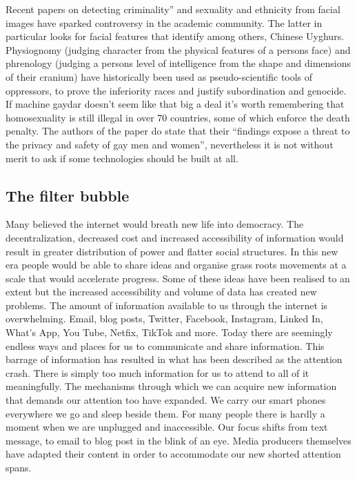 Recent papers on detecting criminality''\cite{CriminalFace} and sexuality\cite{SexualityFace} and ethnicity\cite{EthnicityFace} from facial images have sparked controversy in the academic community. The latter in particular looks for facial features that identify among others, Chinese Uyghurs. Physiognomy (judging character from the physical features of a persons face) and phrenology (judging a persons level of intelligence from the shape and dimensions of their cranium) have historically been used as pseudo-scientific tools of oppressors, to prove the inferiority races and justify subordination and genocide. If machine gaydar doesn't seem like that big a deal it's worth remembering that homosexuality is still illegal in over 70 countries, some of which enforce the death penalty. The authors of the paper do state that their ``findings expose a threat to the privacy and safety of gay men and women'', nevertheless it is not without merit to ask if some technologies should be built at all.

\subsection{The filter bubble}

Many believed the internet would breath new life into democracy. The decentralization, decreased cost and increased accessibility of information would result in greater distribution of power and flatter social structures. In this new era people would be able to share ideas and organise grass roots movements at a scale that would accelerate progress. Some of these ideas have been realised to an extent but the increased accessibility and volume of data has created new problems. The amount of information available to us through the internet is overwhelming. Email, blog posts, Twitter, Facebook, Instagram, Linked In, What's App, You Tube, Netfix, TikTok and more. Today there are seemingly endless ways and places for us to communicate and share information. This barrage of information has resulted in what has been described as the attention crash. There is simply too much information for us to attend to all of it meaningfully. The mechanisms through which we can acquire new information that demands our attention too have expanded. We carry our smart phones everywhere we go and sleep beside them. For many people there is hardly a moment when we are unplugged and inaccessible. Our focus shifts from text message, to email to blog post in the blink of an eye. Media producers themselves have adapted their content in order to accommodate our new shorted attention spans.

